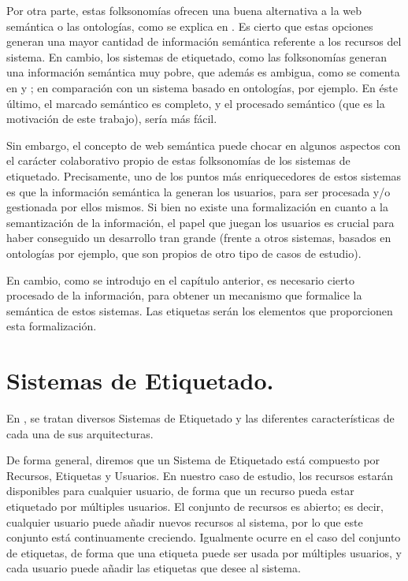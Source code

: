 Por otra parte, estas folksonomías ofrecen una buena alternativa a la web semántica o las ontologías, como se explica en \cite{golder}. Es cierto que estas opciones generan una mayor cantidad de información semántica referente a los recursos del sistema. En cambio, los sistemas de etiquetado, como las folksonomías generan una información semántica muy pobre, que además es ambigua, como se comenta en \cite{algoritmo} y \cite{golder}; en comparación con un sistema basado en ontologías, por ejemplo. En éste último, el marcado semántico es completo, y el procesado semántico (que es la motivación de este trabajo), sería más fácil.

Sin embargo, el concepto de web semántica puede chocar en algunos aspectos con el carácter colaborativo propio de estas folksonomías de los sistemas de etiquetado. Precisamente, uno de los puntos más enriquecedores de estos sistemas es que la información semántica la generan los usuarios, para ser procesada y/o gestionada por ellos mismos. Si bien no existe una formalización en cuanto a la semantización de la información, el papel que juegan los usuarios es crucial para haber conseguido un desarrollo tran grande (frente a otros sistemas, basados en ontologías por ejemplo, que son propios de otro tipo de casos de estudio).

En cambio, como se introdujo en el capítulo anterior, es necesario cierto procesado de la información, para obtener un mecanismo que formalice la semántica de estos sistemas. Las etiquetas serán los elementos que proporcionen esta formalización.






\section{Sistemas de Etiquetado.}

En \cite{smith}, se tratan diversos Sistemas de Etiquetado y las diferentes características de cada una de sus arquitecturas.

De forma general, diremos que un Sistema de Etiquetado está compuesto por Recursos, Etiquetas y Usuarios. En nuestro caso de estudio, los recursos estarán disponibles para cualquier usuario, de forma que un recurso pueda estar etiquetado por múltiples usuarios. El conjunto de recursos es abierto; es decir, cualquier usuario puede añadir nuevos recursos al sistema, por lo que este conjunto está continuamente creciendo. Igualmente ocurre en el caso del conjunto de etiquetas, de forma que una etiqueta puede ser usada por múltiples usuarios, y cada usuario puede añadir las etiquetas que desee al sistema.

